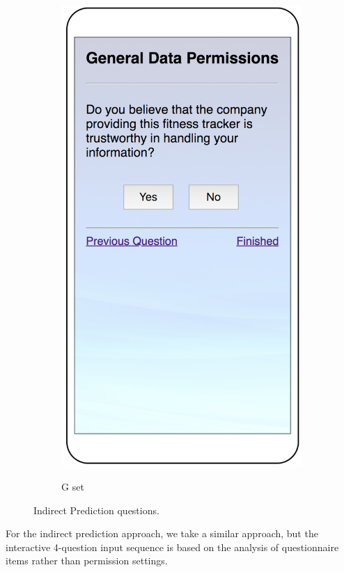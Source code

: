 \begin{figure}
\begin{subfigure}[b]{0.24\textheight}
		\includegraphics[width=0.24\textheight]{figures/indirect4.png}
		\label{fig:indirectd}
		\caption{G set}
	\end{subfigure}
	\caption{Indirect Prediction questions.}
	\label{fig:indirect}
\end{figure}

For the indirect prediction approach, we take a similar approach, but the interactive 4-question input sequence is based on the analysis of questionnaire items rather than permission settings. 

